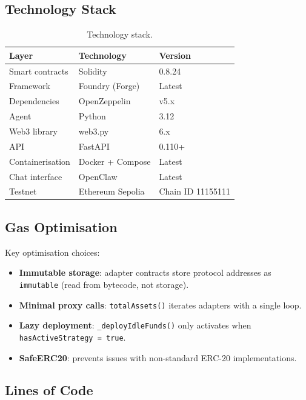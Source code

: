 \documentclass[12pt]{article}
\begin{document}
\subsection{Technology Stack}

\begin{table}[H]
\centering
\caption{Technology stack.}
\label{tab:stack}
\small
\begin{tabular}{@{}lll@{}}
\toprule
\textbf{Layer} & \textbf{Technology} & \textbf{Version} \\
\midrule
Smart contracts   & Solidity           & 0.8.24 \\
Framework         & Foundry (Forge)    & Latest \\
Dependencies      & OpenZeppelin       & v5.x \\
Agent             & Python             & 3.12 \\
Web3 library      & web3.py            & 6.x \\
API               & FastAPI            & 0.110+ \\
Containerisation  & Docker + Compose   & Latest \\
Chat interface    & OpenClaw           & Latest \\
Testnet           & Ethereum Sepolia   & Chain ID 11155111 \\
\bottomrule
\end{tabular}
\end{table}

\subsection{Gas Optimisation}

Key optimisation choices:
\begin{itemize}[nosep]
  \item \textbf{Immutable storage}: adapter contracts store protocol addresses as \texttt{immutable} (read from bytecode, not storage).
  \item \textbf{Minimal proxy calls}: \texttt{totalAssets()} iterates adapters with a single loop.
  \item \textbf{Lazy deployment}: \texttt{\_deployIdleFunds()} only activates when \texttt{hasActiveStrategy = true}.
  \item \textbf{SafeERC20}: prevents issues with non-standard ERC-20 implementations.
\end{itemize}

\subsection{Lines of Code}
\end{document}

